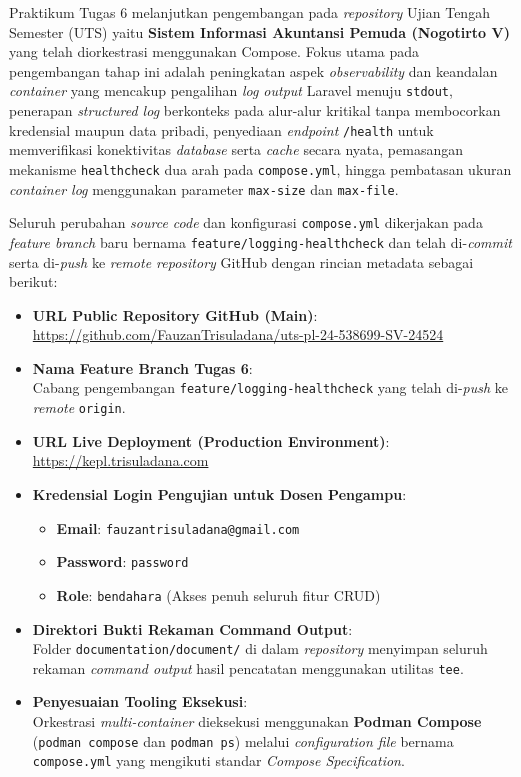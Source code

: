 \documentclass[a4paper,oneside,11pt]{book}
\begin{document}
\par Praktikum Tugas 6 melanjutkan pengembangan pada \textit{repository} Ujian Tengah Semester (UTS) yaitu \textbf{Sistem Informasi Akuntansi Pemuda (Nogotirto V)} yang telah diorkestrasi menggunakan Compose. Fokus utama pada pengembangan tahap ini adalah peningkatan aspek \textit{observability} dan keandalan \textit{container} yang mencakup pengalihan \textit{log output} Laravel menuju \texttt{stdout}, penerapan \textit{structured log} berkonteks pada alur-alur kritikal tanpa membocorkan kredensial maupun data pribadi, penyediaan \textit{endpoint} \texttt{/health} untuk memverifikasi konektivitas \textit{database} serta \textit{cache} secara nyata, pemasangan mekanisme \texttt{healthcheck} dua arah pada \texttt{compose.yml}, hingga pembatasan ukuran \textit{container log} menggunakan parameter \texttt{max-size} dan \texttt{max-file}.

\par Seluruh perubahan \textit{source code} dan konfigurasi \texttt{compose.yml} dikerjakan pada \textit{feature branch} baru bernama \texttt{feature/logging-healthcheck} dan telah di-\textit{commit} serta di-\textit{push} ke \textit{remote repository} GitHub dengan rincian metadata sebagai berikut:
\begin{itemize}[leftmargin=*]
  \item \textbf{URL Public Repository GitHub (Main)}:\\
        {\footnotesize\url{https://github.com/FauzanTrisuladana/uts-pl-24-538699-SV-24524}}
  \item \textbf{Nama Feature Branch Tugas 6}:\\
        Cabang pengembangan \texttt{feature/logging-healthcheck} yang telah di-\textit{push} ke \textit{remote} \texttt{origin}.
  \item \textbf{URL Live Deployment (Production Environment)}:\\
        {\footnotesize\url{https://kepl.trisuladana.com}}
  \item \textbf{Kredensial Login Pengujian untuk Dosen Pengampu}:
        \begin{itemize}[leftmargin=*]
          \item \textbf{Email}: \texttt{fauzantrisuladana@gmail.com}
          \item \textbf{Password}: \texttt{password}
          \item \textbf{Role}: \texttt{bendahara} (Akses penuh seluruh fitur CRUD)
        \end{itemize}
  \item \textbf{Direktori Bukti Rekaman Command Output}:\\
        Folder \texttt{documentation/document/} di dalam \textit{repository} menyimpan seluruh rekaman \textit{command output} hasil pencatatan menggunakan utilitas \texttt{tee}.
  \item \textbf{Penyesuaian Tooling Eksekusi}:\\
        Orkestrasi \textit{multi-container} dieksekusi menggunakan \textbf{Podman Compose} (\texttt{podman compose} dan \texttt{podman ps}) melalui \textit{configuration file} bernama \texttt{compose.yml} yang mengikuti standar \textit{Compose Specification}.
\end{itemize}
\end{document}
